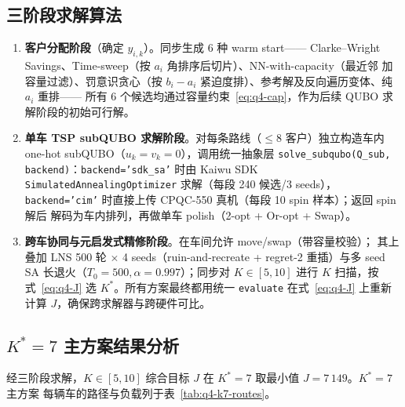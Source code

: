 \documentclass[UTF8,12pt,a4paper]{ctexart}
\begin{document}
\subsection{三阶段求解算法}
\label{subsec:q4-algo}

\begin{enumerate}
  \item[(i)] \textbf{客户分配阶段}（确定 $y_{i,k}$）。同步生成 6 种 warm start——
    Clarke--Wright Savings、Time-sweep（按 $a_i$ 角排序后切片）、NN-with-capacity（最近邻
    加容量过滤）、罚意识贪心（按 $b_i-a_i$ 紧迫度排）、参考解及反向遍历变体、纯 $a_i$ 重排——
    所有 6 个候选均通过容量约束~\eqref{eq:q4-cap}，作为后续 QUBO 求解阶段的初始可行解。
  \item[(ii)] \textbf{单车 TSP subQUBO 求解阶段}。对每条路线（$\le 8$ 客户）独立构造车内
    one-hot subQUBO（$u_k=v_k=0$），调用统一抽象层
    \texttt{solve\_subqubo(Q\_sub, backend)}：\texttt{backend='sdk\_sa'} 时由 Kaiwu SDK
    \texttt{SimulatedAnnealingOptimizer} 求解（每段 240 候选/3 seeds），
    \texttt{backend='cim'} 时直接上传 CPQC-550 真机（每段 10 spin 样本）；返回 spin 解后
    解码为车内排列，再做单车 polish（2-opt + Or-opt + Swap）。
  \item[(iii)] \textbf{跨车协同与元启发式精修阶段}。在车间允许 move/swap（带容量校验）；
    其上叠加 LNS 500 轮 $\times$ 4 seeds（ruin-and-recreate + regret-2 重插）与多 seed SA
    长退火（$T_0=500,\alpha=0.997$）；同步对 $K\in[5,10]$ 进行 $K$ 扫描，按
    式~\eqref{eq:q4-J} 选 $K^*$。所有方案最终都用统一 \texttt{evaluate} 在式~\eqref{eq:q4-J}
    上重新计算 $J$，确保跨求解器与跨硬件可比。
\end{enumerate}

\subsection{$K^*\!=\!7$ 主方案结果分析}
\label{subsec:q4-k7}

经三阶段求解，$K\in[5,10]$ 综合目标 $J$ 在 $K^*=7$ 取最小值 $J=7\,149$。$K^*=7$ 主方案
每辆车的路径与负载列于表~\ref{tab:q4-k7-routes}。
\end{document}
